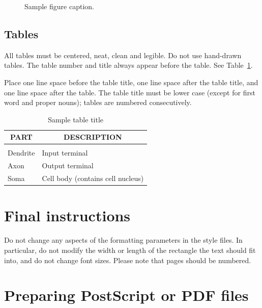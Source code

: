 \documentclass{article} %
\begin{document}
\begin{figure}[h]
\begin{center}
\fbox{\rule[-.5cm]{0cm}{4cm} \rule[-.5cm]{4cm}{0cm}}
\end{center}
\caption{Sample figure caption.}
\end{figure}

\subsection{Tables}

All tables must be centered, neat, clean and legible. Do not use hand-drawn
tables. The table number and title always appear before the table. See
Table~\ref{sample-table}.

Place one line space before the table title, one line space after the table
title, and one line space after the table. The table title must be lower case
(except for first word and proper nouns); tables are numbered consecutively.

\begin{table}[t]
\caption{Sample table title}
\label{sample-table}
\begin{center}
\begin{tabular}{ll}
\multicolumn{1}{c}{\bf PART}  &\multicolumn{1}{c}{\bf DESCRIPTION}
\\ \hline \\
Dendrite         &Input terminal \\
Axon             &Output terminal \\
Soma             &Cell body (contains cell nucleus) \\
\end{tabular}
\end{center}
\end{table}

\section{Final instructions}
Do not change any aspects of the formatting parameters in the style
files.  In particular, do not modify the width or length of the
rectangle the text should fit into, and do not change font sizes.
Please note that pages should be numbered.

\section{Preparing PostScript or PDF files}
\end{document}
